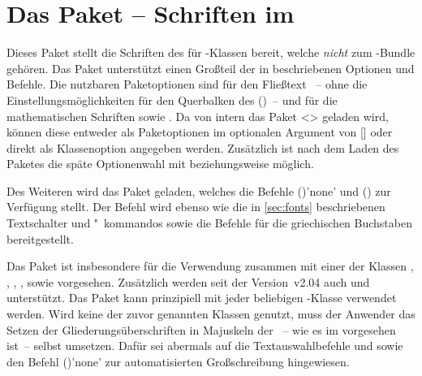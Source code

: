 \begin{Bundle*}{}
\bigskip\noindent
{}%
%
%
\end{Bundle*}



\section{Das Paket  -- Schriften im \CD}
\begin{Bundle*}[v2.02]{}
\printchangedatlist%
%
Dieses Paket stellt die Schriften des \CDs für -Klassen bereit, 
welche \emph{nicht} zum \TUDScript-Bundle gehören. Das Paket unterstützt einen 
Großteil der in  beschriebenen Optionen und Befehle. Die 
nutzbaren Paketoptionen sind für den Fließtext ~-- ohne die 
Einstellungsmöglichkeiten für den Querbalken des \CDs ()~-- und 
für die mathematischen Schriften  sowie . 
Da von  intern das Paket <> geladen 
wird, können diese entweder als Paketoptionen im optionalen Argument von 
[] oder 
direkt als Klassenoption angegeben werden. Zusätzlich ist nach dem Laden des 
Paketes die späte Optionenwahl mit  beziehungsweise 
 möglich.

Des Weiteren wird das Paket  geladen, welches die Befehle 
()'none' und 
() zur Verfügung stellt. Der Befehl 
 wird ebenso wie die in \autoref{sec:fonts} beschriebenen 
Textschalter und "~kommandos sowie die Befehle für die griechischen Buchstaben 
bereitgestellt.

Das Paket  ist insbesondere für die Verwendung zusammen 
mit einer der Klassen , , , 
,  sowie  vorgesehen. Zusätzlich 
werden seit der Version~v2.04 
auch  und  unterstützt. Das Paket kann 
prinzipiell mit jeder beliebigen -Klasse verwendet werden. Wird 
keine der zuvor genannten Klassen genutzt, muss der Anwender das Setzen der 
Gliederungsüberschriften in Majuskeln der \DIN~-- wie es im \CD vorgesehen 
ist~-- selbst umsetzen. Dafür sei abermals auf die Textauswahlbefehle 
 und  sowie den Befehl 
()'none' zur automatisierten 
Großschreibung hingewiesen.


\end{Bundle*}
